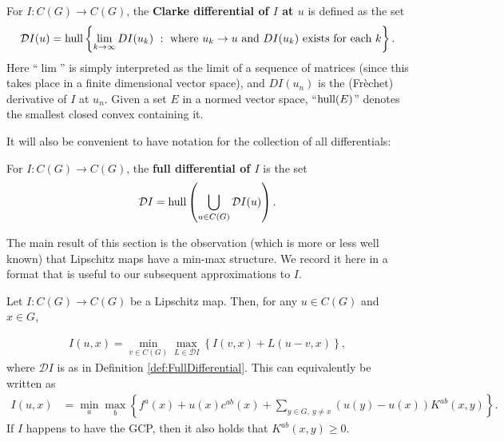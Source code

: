 \documentclass[11pt,reqno]{amsart}
\numberwithin{equation}{section}
\theoremstyle{plain}
\def\D{\mathcal D}
\def\hull{\textnormal{hull}}
\def\Union{\bigcup}
\begin{document}
\begin{DEF}\label{def:ClarkeDifferential}
	For $I: C(G)\to C(G)$, the \textbf{Clarke differential of $I$ at $u$}  is defined as the set 
	\begin{align*}
		\mathcal{D}I(u) = \hull\left\{\lim_{k\to\infty} DI(u_k)\ :\textnormal{ where } u_k\to u\ \text{and}\ DI(u_k)\ \text{exists for each } k \right\}.
	\end{align*}
	Here ``$\lim$'' is simply interpreted as the limit of a sequence of matrices (since this takes place in a finite dimensional vector space), and $DI(u_n)$ is the (Fr\`echet) derivative of $I$ at $u_n$.
	Given a set $E$ in a normed vector space, ``$\hull(E)$'' denotes the smallest closed convex containing it.
\end{DEF}

It will also be convenient to have notation for the collection of all differentials:
\begin{DEF}\label{def:FullDifferential}
	For $I:C(G)\to C(G)$, the \textbf{full differential of $I$} is the set
	\begin{align*}
		\D I = \hull\left(\Union_{u\in C(G)} \D I(u) \right).
	\end{align*}
\end{DEF}


The main result of this section is the observation (which is more or less well known) that Lipschitz maps have a min-max structure.  We record it here in a format that is useful to our subsequent approximations to $I$.
\begin{lem}\label{lem:FiniteDimensionalMinMax}
  Let $I:C(G)\to C(G)$ be a Lipschitz map. Then, for any $u \in C(G)$ and $x\in G$,
  
  \begin{align}\label{eqFinDim:FinDimMinMaxUsingDI}
	  I(u,x) = \min_{v\in C(G)}\max_{L\in\D I}\left\{ I(v,x) + L(u-v,x)   \right\},
  \end{align}
  where $\D I$ is as in Definition \ref{def:FullDifferential}.  This can equivalently be written as
  \begin{align}\label{eqFinDim:FinDimMinMaxUsingSummation}
    I(u,x) & = \min \limits_{a}\max_{b}	\left \{f^{a}(x)+ u(x)c^{ab}(x)+\sum\limits_{y\in G,\ y\not=x} (u(y)-u(x))K^{ab}(x,y) \right \}.
  \end{align}
 	  If $I$ happens to have the GCP, then it also holds that $K^{ab}(x,y)\geq0$.

\end{lem}
\end{document}
